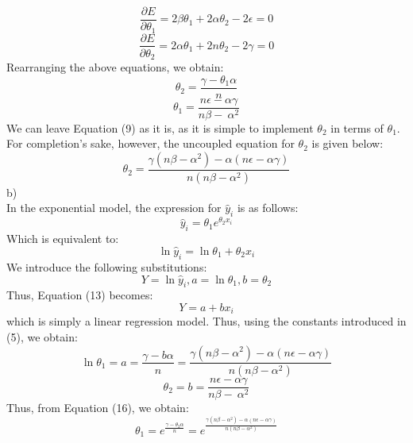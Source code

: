 \documentclass[10pt]{article}
\begin{document}
\begin{equation}
\frac{\partial E}{\partial \theta_{1}} = 2 \beta \theta_{1} + 2 \alpha \theta_{2} - 2 \epsilon = 0
\end{equation}
\begin{equation}
\frac{\partial E}{\partial \theta_{2}} = 2 \alpha \theta_{1} + 2 n \theta_{2} - 2 \gamma = 0
\end{equation}
Rearranging the above equations, we obtain:
\begin{equation}
\theta_{2} = \frac{\gamma-\theta_{1}\alpha}{n}
\end{equation}
\begin{equation}
\theta_{1} = \frac{n\epsilon - \alpha \gamma}{n\beta - \ \alpha^2}
\end{equation}
We can leave Equation (9) as it is, as it is simple to implement $\theta_{2}$ in terms of $\theta_{1}$. For completion's sake, however, the uncoupled equation for $\theta_{2}$ is given below:
\begin{equation}
\theta_{2} = \frac{\gamma(n\beta-\alpha^2)-\alpha(n\epsilon-\alpha\gamma)}{n(n\beta-\alpha^2)}
\end{equation}
b)\\
In the exponential model, the expression for $\hat{y}_{i}$ is as follows:
\begin{equation}
\hat{y}_{i} = \theta_{1} e^{\theta_{2}x_{i}}
\end{equation}
Which is equivalent to:
\begin{equation}
\ln{\hat{y}_{i}} = \ln{\theta_{1}}+\theta_{2} x_{i}
\end{equation}
We introduce the following substitutions:
\begin{equation}
Y = \ln{\hat{y}_{i}}, a = \ln{\theta_{1}}, b = \theta_{2}
\end{equation}
Thus, Equation (13) becomes:
\begin{equation}
Y = a + b x_{i}
\end{equation}
which is simply a linear regression model. Thus, using the constants introduced in (5), we obtain:
\begin{equation}
\ln{\theta_{1}} = a = \frac{\gamma-b\alpha}{n} = \frac{\gamma(n\beta-\alpha^2)-\alpha(n\epsilon-\alpha\gamma)}{n(n\beta-\alpha^2)}
\end{equation}
\begin{equation}
\theta_{2} = b = \frac{n\epsilon - \alpha \gamma}{n\beta - \ \alpha^2} 
\end{equation}
Thus, from Equation (16), we obtain:
\begin{equation}
\theta_{1} = e^{\frac{\gamma-\theta_{2}\alpha}{n}} = e^{\frac{\gamma(n\beta-\alpha^2)-\alpha(n\epsilon-\alpha\gamma)}{n(n\beta-\alpha^2)}}
\end{equation}
\end{document}
